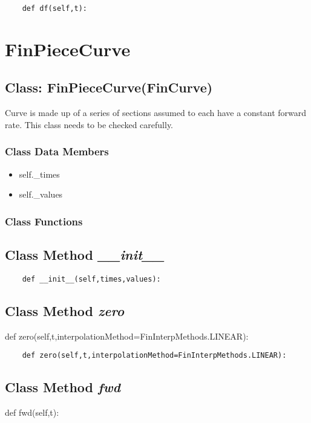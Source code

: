 \documentclass[twoside,11pt]{book}
\begin{document}
\begin{lstlisting}
    def df(self,t):
\end{lstlisting}

\newpage
\section{FinPieceCurve}

\subsection{Class: FinPieceCurve(FinCurve)}
Curve is made up of a series of sections assumed to each have a constant forward rate. This class needs to be checked carefully. 

\subsubsection{Class Data Members}
\begin{itemize}
\item{self.\_times}
\item{self.\_values}
\end{itemize}

\subsubsection{Class Functions}

\subsection{Class Method {\it \_\_init\_\_}}


\begin{lstlisting}
    def __init__(self,times,values):
\end{lstlisting}

\subsection{Class Method {\it zero}}
def zero(self,t,interpolationMethod=FinInterpMethods.LINEAR):

\begin{lstlisting}
    def zero(self,t,interpolationMethod=FinInterpMethods.LINEAR):
\end{lstlisting}

\subsection{Class Method {\it fwd}}
def fwd(self,t):
\end{document}
